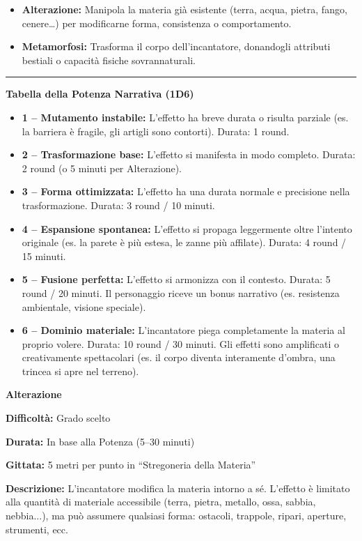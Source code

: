 \documentclass[./magie.tex]{subfiles}
\begin{document}
\begin{itemize}
\item \textbf{Alterazione:} Manipola la materia già esistente (terra, acqua, pietra, fango, cenere…) per modificarne forma, consistenza o comportamento.
\item \textbf{Metamorfosi:} Trasforma il corpo dell’incantatore, donandogli attributi bestiali o capacità fisiche sovrannaturali.
\end{itemize}

\vspace{0.2cm}
\noindent
\begin{center}
\rule{\textwidth}{0.4pt} 
\end{center}
\vspace{0.2cm}
{\zarafirtitlefont\Large\bfseries\noindent Tabella della Potenza Narrativa (1D6)}
\begin{itemize}
\item \textbf{1 – Mutamento instabile:} L’effetto ha breve durata o risulta parziale (es. la barriera è fragile, gli artigli sono contorti). Durata: 1 round.
\item \textbf{2 – Trasformazione base:} L’effetto si manifesta in modo completo. Durata: 2 round (o 5 minuti per Alterazione).
\item \textbf{3 – Forma ottimizzata:} L’effetto ha una durata normale e precisione nella trasformazione. Durata: 3 round / 10 minuti.
\item \textbf{4 – Espansione spontanea:} L’effetto si propaga leggermente oltre l’intento originale (es. la parete è più estesa, le zanne più affilate). Durata: 4 round / 15 minuti.
\item \textbf{5 – Fusione perfetta:} L’effetto si armonizza con il contesto. Durata: 5 round / 20 minuti. Il personaggio riceve un bonus narrativo (es. resistenza ambientale, visione speciale).
\item \textbf{6 – Dominio materiale:} L’incantatore piega completamente la materia al proprio volere. Durata: 10 round / 30 minuti. Gli effetti sono amplificati o creativamente spettacolari (es. il corpo diventa interamente d’ombra, una trincea si apre nel terreno).
\end{itemize}

{\zarafirtitlefont\Large\bfseries\noindent Alterazione}\\
\begin{description}
\item \textbf{Difficoltà:} Grado scelto
\item \textbf{Durata:} In base alla Potenza (5–30 minuti)
\item \textbf{Gittata:} 5 metri per punto in “Stregoneria della Materia”
\item \textbf{Descrizione:} L’incantatore modifica la materia intorno a sé. L’effetto è limitato alla quantità di materiale accessibile (terra, pietra, metallo, ossa, sabbia, nebbia...), ma può assumere qualsiasi forma: ostacoli, trappole, ripari, aperture, strumenti, ecc.
\end{description}
\end{document}
